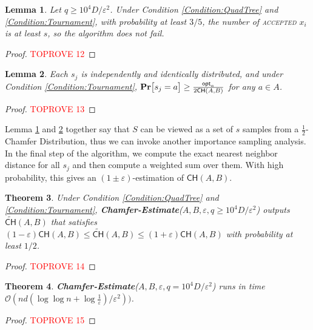 \documentclass[11pt]{article}
\newcommand{\eps}{\varepsilon}
\theoremstyle{plain}
\newtheorem{theorem}{Theorem}[section]
\newtheorem{lem}[theorem]{Lemma}
\newcommand{\OO}{\mathcal{O}}
\newcommand{\pr}[1]{\text{\bf Pr}\normalfont\bigl[ #1 \bigr]}
\newcommand{\opt}{\mathsf{opt}}
\begin{document}
\begin{lem}\label{Lemma:size}
    Let $q \geq 10^4{{D}}/\eps^2$. Under Condition \ref{Condition:QuadTree} and \ref{Condition:Tournament}, with probability at least $3/5$, the number of \textsc{accepted} $x_i$ is at least $s$, so the algorithm does not fail.
\end{lem}

\begin{proof}\textcolor{red}{TOPROVE 12}\end{proof}



\begin{lem}\label{Lemma:equivalent}
    Each $s_j$ is independently and identically distributed, and under Condition \ref{Condition:Tournament}, $\pr{s_j = a} \geq \frac{\opt_a}{2\mathsf{CH}(A, B)}$ for any $a \in A$.
\end{lem}

\begin{proof}\textcolor{red}{TOPROVE 13}\end{proof}


Lemma \ref{Lemma:size} and \ref{Lemma:equivalent} together say that $S$ can be viewed as a set of $s$ samples from a $\frac{1}{2}$-Chamfer Distribution, thus we can invoke another importance sampling analysis. In the final step of the algorithm, we compute the exact nearest neighbor distance for all $s_j$ and then compute a weighted sum over them. With high probability, this gives an $(1\pm\eps)$-estimation of $\mathsf{CH}(A, B)$.

\begin{theorem}
    Under Condition \ref{Condition:QuadTree} and \ref{Condition:Tournament}, {\normalfont \textbf{Chamfer-Estimate}($A, B, \eps, q \geq 10^4{{D}}/\eps^2$)} outputs $\tilde{\mathsf{CH}}(A, B)$ that satisfies $(1-\eps)\mathsf{CH}(A, B) \leq \tilde{\mathsf{CH}}(A, B) \leq (1+\eps)\mathsf{CH}(A, B)$ with probability at least $1/2$.
\end{theorem}

\begin{proof}\textcolor{red}{TOPROVE 14}\end{proof}


\begin{theorem}
    {\normalfont \textbf{Chamfer-Estimate}($A, B, \eps, q = 10^4{{D}}/\eps^2$)} runs in time $\OO(nd(\log\log n + \log \frac{1}{\eps})/\eps^2))$.
\end{theorem}

\begin{proof}\textcolor{red}{TOPROVE 15}\end{proof} 
\end{document}
